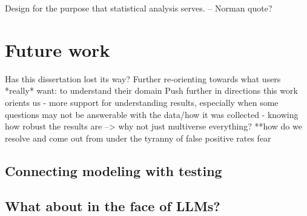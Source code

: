Design for the purpose that statistical analysis serves. -- Norman quote?

\section{Future work}
Has this dissertation lost its way? Further re-orienting towards what users *really* want: to understand their domain
Push further in directions this work orients us 
- more support for understanding results, especially when some questions may not be answerable with the data/how it was collected
- knowing how robust the results are --> why not just multiverse everything?
**how do we resolve and come out from under the tyranny of false positive rates fear

\subsection{Connecting modeling with testing} 

\subsection{What about in the face of LLMs?}
